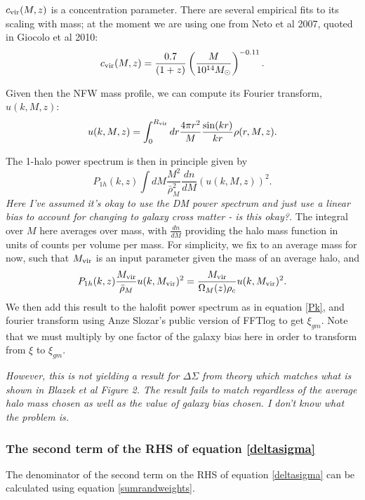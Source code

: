 \documentclass[onecolumn,amsmath,aps,fleqn, superscriptaddress]{revtex4}
\begin{document}
$c_{\rm vir}(M,z)$ is a concentration parameter. There are several empirical fits to its scaling with mass; at the moment we are using one from Neto et al 2007, quoted in Giocolo et al 2010:
\begin{equation}
c_{\rm vir}(M,z) = \frac{0.7}{(1+z)}\left(\frac{M}{10^{14}M_{\odot}}\right)^{-0.11}.
\label{cvir}
\end{equation}

Given then the NFW mass profile, we can compute its Fourier transform, $u(k, M, z)$:
\begin{equation}
u(k, M, z) = \int_0^{R_{\rm vir}} dr \frac{4 \pi r^2}{M}\frac{\sin(kr)}{kr}\rho(r, M, z).
\label{u}
\end{equation}

The 1-halo power spectrum is then in principle given by
\begin{equation}
P_{1h}(k,z) \int dM \frac{M^2}{\bar{\rho}_M^2} \frac{dn}{dM} (u(k, M, z))^2.
\label{P1h_dndm}
\end{equation}
{\it Here I've assumed it's okay to use the DM power spectrum and just use a linear bias to account for changing to galaxy cross matter - is this okay?.} The integral over $M$ here averages over mass, with $\frac{dn}{dM}$ providing the halo mass function in units of counts per volume per mass. For simplicity, we fix to an average mass for now, such that $M_{\rm vir}$ is an input parameter given the mass of an average halo, and 
\begin{equation}
P_{1h}(k,z) \frac{M_{\rm vir}}{\bar{\rho}_M} u(k,M_{\rm vir})^2 = \frac{M_{\rm vir}}{\Omega_M(z) \rho_c} u(k,M_{\rm vir})^2.
\label{P1h_onemass}
\end{equation}
We then add this result to the halofit power spectrum as in equation \ref{Pk}, and fourier transform using Anze Slozar's public version of FFTlog to get $\xi_{gm}$. Note that we must multiply by one factor of the galaxy bias here in order to transform from $\xi$ to $\xi_{gm}$.

{\it However, this is not yielding a result for $\Delta \Sigma$ from theory which matches what is shown in Blazek et al Figure 2. The result fails to match regardless of the average halo mass chosen as well as the value of galaxy bias chosen. I don't know what the problem is.}

\subsubsection*{The second term of the RHS of equation \ref{deltasigma}}
The denominator of the second term on the RHS of equation \ref{deltasigma} can be calculated using equation \ref{sumrandweights}. 
\end{document}
